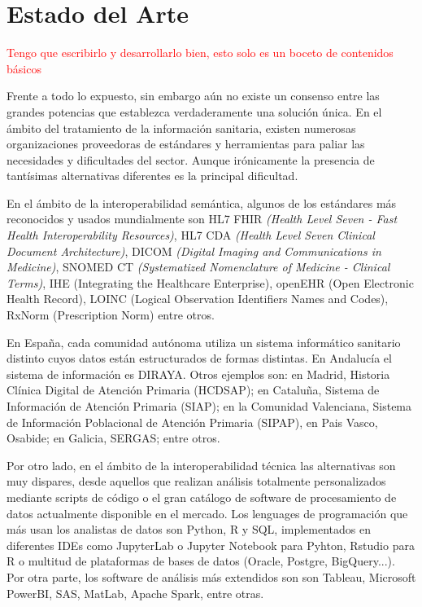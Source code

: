 \section{Estado del Arte} \label{sec:01EstadoArte} 

\textcolor{red}{Tengo que escribirlo y desarrollarlo bien, esto solo es un boceto de contenidos básicos}


Frente a todo lo expuesto, sin embargo aún no existe un consenso entre las grandes potencias que establezca verdaderamente una solución única. En el ámbito del tratamiento de la información sanitaria, existen numerosas organizaciones proveedoras de estándares y herramientas para paliar las necesidades y dificultades del sector. Aunque irónicamente la presencia de tantísimas alternativas diferentes es la principal dificultad.

En el ámbito de la interoperabilidad semántica, algunos de los estándares más reconocidos y usados mundialmente son HL7 FHIR \textit{(Health Level Seven - Fast Health Interoperability Resources)}, HL7 CDA \textit{(Health Level Seven Clinical Document Architecture)}, DICOM \textit{(Digital Imaging and Communications in Medicine)}, SNOMED CT \textit{(Systematized Nomenclature of Medicine - Clinical Terms)}, IHE (Integrating the Healthcare Enterprise), openEHR (Open Electronic Health Record), LOINC (Logical Observation Identifiers Names and Codes), RxNorm (Prescription Norm) entre otros.

En España, cada comunidad autónoma utiliza un sistema informático sanitario distinto cuyos datos están estructurados de formas distintas. En Andalucía el sistema de información es DIRAYA. Otros ejemplos son: en Madrid, Historia Clínica Digital de Atención Primaria (HCDSAP); en Cataluña, Sistema de Información de Atención Primaria (SIAP); en la Comunidad Valenciana, Sistema de Información Poblacional de Atención Primaria (SIPAP), en Pais Vasco, Osabide; en Galicia, SERGAS; entre otros.

Por otro lado, en el ámbito de la interoperabilidad técnica las alternativas son muy dispares, desde aquellos que realizan análisis totalmente personalizados mediante scripts de código o el gran catálogo de software de procesamiento de datos actualmente disponible en el mercado. Los lenguages de programación que más usan los analistas de datos son Python, R y SQL, implementados en diferentes IDEs como JupyterLab o Jupyter Notebook para Pyhton, Rstudio para R o multitud de plataformas de bases de datos (Oracle, Postgre, BigQuery...). Por otra parte, los software de análisis más extendidos son son Tableau, Microsoft PowerBI, SAS, MatLab, Apache Spark, entre otras. 

